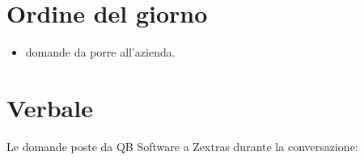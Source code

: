 \documentclass[12pt]{article}
\begin{document}
    \section{Ordine del giorno}
    \begin{itemize}
    	\item domande da porre all'azienda.
    \end{itemize}
    
    \section{Verbale}
    Le domande poste da QB Software a Zextras durante la conversazione:
    
    \newcommand{\answer}{\item[\textbf{A:}]}
\end{document}
